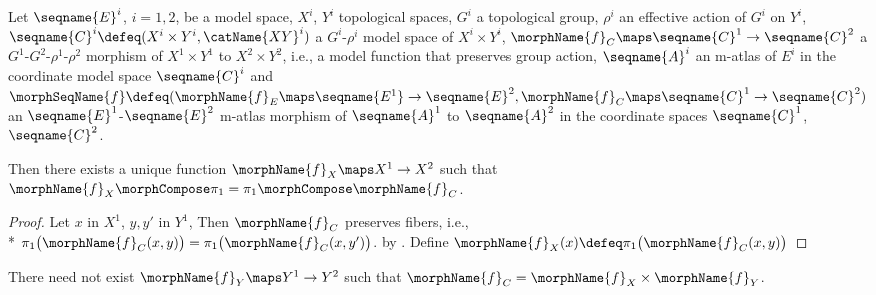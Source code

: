 \documentclass{article}
\begin{document}
\begin{lemma}
\label{lem:BunAtlbasemorph}
Let $\seqname{E}^i$, $i=1,2$, be a model space, $X^i$, $Y^i$ topological
spaces, $G^i$ a topological group, $\rho^i$ an effective action of $G^i$
on $Y^i$, $\seqname{C}^i \defeq (X^i \times Y^i, \catName{XY}^i)$ a
$G^i$-$\rho^i$ model space of $X^i \times Y^i$,
$\morphName{f}_C \maps \seqname{C}^1 \to \seqname{C}^2$ a
$G^1$-$G^2$-$\rho^1$-$\rho^2$ morphism of
$X^1 \times Y^1$ to $X^2 \times Y^2$, i.e., a model function that
preserves group action, $\seqname{A}^i$ an m-atlas of $E^i$ in the
coordinate model space $\seqname{C}^i$ and
$
  \morphSeqName{f} \defeq
  (
    \morphName{f}_E \maps \seqname{E^1} \to \seqname{E}^2,
    \morphName{f}_C \maps \seqname{C}^1 \to \seqname{C}^2
  )
$
an $\seqname{E}^1$-$\seqname{E}^2$ m-atlas morphism of $\seqname{A}^1$
to $\seqname{A}^2$ in the coordinate spaces $\seqname{C}^1$,
$\seqname{C}^2$.

Then there exists a unique function $\morphName{f}_X \maps X^1 \to X^2$
such that $\morphName{f}_X \morphCompose \pi_1 = \pi_1 \morphCompose \morphName{f}_C$.

\begin{proof}
Let $x$ in $X^1$, $y,y'$ in $Y^1$, Then
$\morphName{f}_C$ preserves fibers, i.e., \\*
$
\pi_1 \bigl ( \morphName{f}_C(x,y) \bigr ) =
\pi_1 \bigl ( \morphName{f}_C(x,y') \bigr )
$.
by . Define
$\morphName{f}_X(x) \defeq \pi_1 \bigl ( \morphName{f}_C(x,y) \bigr )$
\end{proof}

\begin{remark}
There need not exist $\morphName{f}_Y \maps Y^1 \to Y^2$ such that
$\morphName{f}_C = \morphName{f}_X \times \morphName{f}_Y$.
\end{remark}
\end{lemma}
\end{document}
